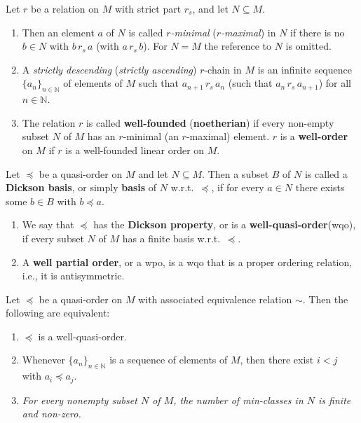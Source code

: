 \begin{definition}\label{def:well-founded}
    Let $r$ be a relation on $M$ with strict part $r_s$, and let $N \subseteq M$.
    \begin{enumerate}
        \item Then an element $a$ of $N$ is called \textit{$r$-minimal} (\textit{$r$-maximal}) in $N$ if there is no $b \in N$ with $b \, r_s \, a$ (with $a \, r_s \, b$).
        For $N = M$ the reference to $N$ is omitted.
    
        \item A \textit{strictly descending} (\textit{strictly ascending}) $r$-chain in $M$ is an infinite sequence $\{a_n\}_{n \in \mathbb{N}}$ of elements of $M$ such that $a_{n+1} \, r_s \, a_n$ (such that $a_n \, r_s \, a_{n+1}$) for all $n \in \mathbb{N}$.
    
        \item The relation $r$ is called \textbf{well-founded} (\textbf{noetherian}) if every non-empty subset $N$ of $M$ has an $r$-minimal (an $r$-maximal) element.
        $r$ is a \textbf{well-order} on $M$ if $r$ is a well-founded linear order on $M$.
    \end{enumerate}
\end{definition}
    
\begin{definition}\label{def:wqo}
    Let $\preceq$ be a quasi-order on $M$ and let $N \subseteq M$. 
    Then a subset $B$ of $N$ is called a \textbf{Dickson basis}, or simply \textbf{basis} of $N$ w.r.t.\ $\preceq$, if for every $a \in N$ there exists some $b \in B$ with $b \preceq a$.
    \begin{enumerate}
        \item We say that $\preceq$ has the \textbf{Dickson property}, or is a \textbf{well-quasi-order}(wqo), if every subset $N$ of $M$ has a finite basis w.r.t.\ $\preceq$.
        \item A \textbf{well partial order}, or a wpo, is a wqo that is a proper ordering relation, i.e., it is antisymmetric.
    \end{enumerate}
\end{definition}
    
\begin{proposition}\label{prop:wqoEquivalent}
    Let $\preceq$ be a quasi-order on $M$ with associated equivalence relation $\sim$. 
    Then the following are equivalent:
    \begin{enumerate}
        \item $\preceq$ is a well-quasi-order.
        \item Whenever $\{a_n\}_{n \in \mathbb{N}}$ is a sequence of elements of $M$, then there exist $i < j$ with $a_i \preceq a_j$.
        \item \textit{For every nonempty subset $N$ of $M$, the number of min-classes in $N$ is finite and non-zero.}
    \end{enumerate}
\end{proposition}
    
